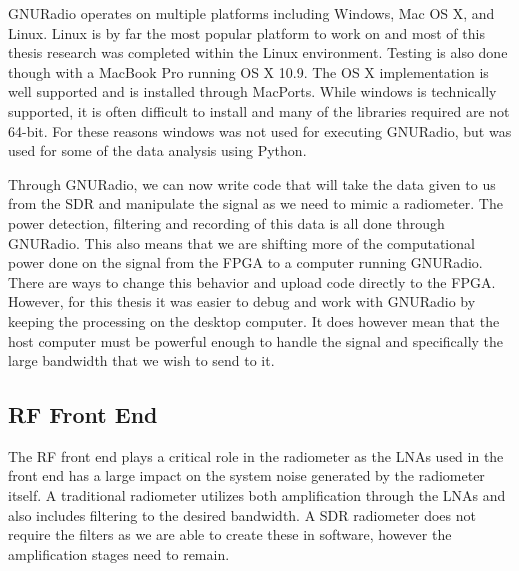 GNURadio operates on multiple platforms including Windows, Mac OS X, and Linux.  Linux is by far the most popular platform to work on and most of this thesis research was completed within the Linux environment.  Testing is also done though with a MacBook Pro running OS X 10.9.  The OS X implementation is well supported and is installed through MacPorts.  While windows is technically supported, it is often difficult to install and many of the libraries required are not 64-bit.  For these reasons windows was not used for executing GNURadio, but was used for some of the data analysis using Python.

Through GNURadio, we can now write code that will take the data given to us from the SDR and manipulate the signal as we need to mimic a radiometer.  The power detection, filtering and recording of this data is all done through GNURadio.  This also means that we are shifting more of the computational power done on the signal from the FPGA to a computer running GNURadio.  There are ways to change this behavior and upload code directly to the FPGA.  However, for this thesis it was easier to debug and work with GNURadio by keeping the processing on the desktop computer.  It does however mean that the host computer must be powerful enough to handle the signal and specifically the large bandwidth that we wish to send to it.  

\subsection{RF Front End}
The RF front end plays a critical role in the radiometer as the LNAs used in the front end has a large impact on the system noise generated by the radiometer itself.  A traditional radiometer utilizes both amplification through the LNAs and also includes filtering to the desired bandwidth.  A SDR radiometer does not require the filters as we are able to create these in software, however the amplification stages need to remain.  

